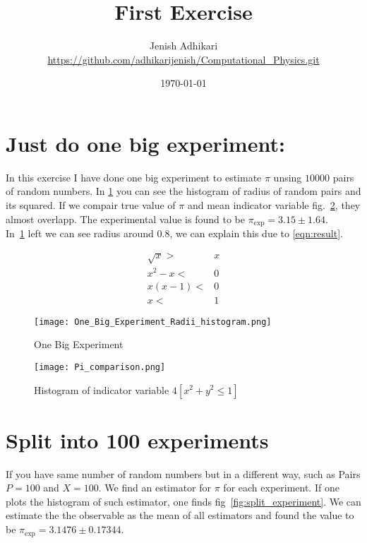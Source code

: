 \documentclass[titlepage]{scrartcl}
\title{First Exercise}
\author{Jenish Adhikari \\ \url{https://github.com/adhikarijenish/Computational_Physics.git}}
\date{\today}
\begin{document}
\maketitle
\tableofcontents
\clearpage
\newpage
{}

\section{Just do one big experiment:}
In this exercise I have done one big experiment to estimate $\pi$ unsing $10000$ pairs of random numbers. 
In \cref{fig:One_Big_Experiment_Radii_histogram} you can see the histogram of radius of random pairs and its squared. 
If we compair true value of $\pi$ and mean indicator variable fig.~\cref{fig:Pi_comparison}, they almost overlapp.
The experimental value is found to be $\pi_{\exp} = 3.15 \pm 1.64 $.\\
In~\cref{fig:One_Big_Experiment_Radii_histogram} left we can see radius around 0.8, we can explain this due to \cref{eqn:result}.

\begin{align}\label{eqn:result}
    \sqrt{x} >& x \\ \nonumber
    x^2 - x <& 0 \\ \nonumber
    x(x-1) <& 0\\ \nonumber
    x <& 1 
\end{align}


\begin{figure}[htp]
    \centering
    \texttt{[image: One\_Big\_Experiment\_Radii\_histogram.png]}
    \caption[OBE]{One Big Experiment}\label{fig:One_Big_Experiment_Radii_histogram}
\end{figure}

\begin{figure}[htp]
    \centering
    \texttt{[image: Pi\_comparison.png]}\label{fig:Pi_comparison}
    \caption{Histogram of indicator variable $4[x^2+y^2\le1]$} 
\end{figure}

\section{Split into 100 experiments}
If you have same number of random numbers but in a different way, such as Pairs $P = 100$ and $X=100$. We find an estimator for $\pi$
for each experiment. If one plots the histogram of such estimator, one finds fig~\cref{fig:split_experiment}. We can estimate the
the observable as the mean of all estimators and found the value to be $\pi_{\exp}= 3.1476 \pm 0.17344 $.
\end{document}

